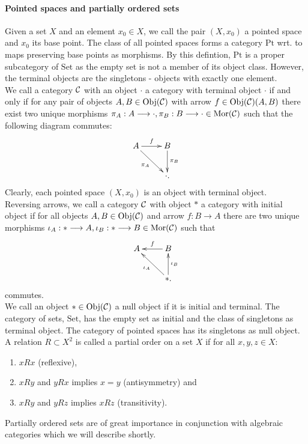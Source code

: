 \paragraph{Pointed spaces and partially ordered sets}
Given a set $X$ and an element $x_0 \in X$, we call the pair $(X,x_0)$ a pointed space and $x_0$ its base point. The class of all pointed spaces forms a category $\mathrm{Pt}$ wrt. to maps preserving base points as morphisms. By this defintion, $\mathrm{Pt}$ is a proper subcategory of $\mathrm{Set}$ as the empty set is not a member of its object class. However, the terminal objects are the singletons - objects with exactly one element.\\
\indent We call a category $\mathcal{C}$ with an object $\cdot$ a category with terminal object $\cdot$ if and only if for any pair of objects $A, B \in \mathrm{Obj}({\mathcal{C}})$ with arrow $f \in \mathrm{Obj}({\mathcal{C}})(A,B)$ there exist two unique morphisms $\pi_A : A \longrightarrow \cdot, \pi_B : B \longrightarrow \cdot \in \mathrm{Mor}(\mathcal{C})$ such that the following diagram commutes:
$$\xymatrix{
A \ar[r]^f \ar[dr]_{\pi_A} & B\ar[d]^{\pi_B}\\
&\cdot.\\
}$$
Clearly, each pointed space $(X,x_0)$ is an object with terminal object.\\
\indent Reversing arrows, we call a category $\mathcal{C}$ with object $\ast$ a category with initial object if for all objects $A, B \in \mathrm{Obj}({\mathcal{C}})$ and arrow $f : B \longrightarrow A$ there are two unique morphisms $\iota_A : \ast \longrightarrow A, \iota_B : \ast \longrightarrow B \in \mathrm{Mor}(\mathcal{C})$ such that
$$\xymatrix{
A & B\ar[l]_f\\
&\ast\ar[u]_{\iota_B} \ar[ul]^{\iota_A} .\\
}$$
commutes.\\
\indent We call an object $\ast \in \mathrm{Obj}({\mathcal{C}})$ a null object if it is initial and terminal. The category of sets, $\mathrm{Set}$, has the empty set as initial and the class of singletons as terminal object. The category of pointed spaces has its singletons as null object.\\
\indent A relation $R \subset X^2$ is called a partial order on a set $X$ if for all $x, y, z \in X$:
\begin{enumerate}
\item $x R x$ (reflexive),
\item $x R y$ and $y R x$ implies $x = y$ (antisymmetry) and
\item $x R y$ and $y R z$ implies $x R z$ (transitivity).
\end{enumerate}
Partially ordered sets are of great importance in conjunction with algebraic categories which we will describe shortly.

